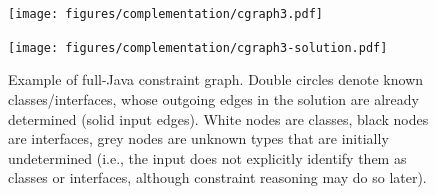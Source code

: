 \begin{figure}[ht]
  \begin{minipage}[b]{.5\linewidth}
    \centering
    \texttt{[image: figures/complementation/cgraph3.pdf]}
    \label{hiercomp/fig:real-example:problem}
  \end{minipage}
  \begin{minipage}[b]{.5\linewidth}
    \centering
    \texttt{[image: figures/complementation/cgraph3-solution.pdf]}
    \label{hiercomp/fig:real-example:solution}
  \end{minipage}
  \caption[Example of full-Java constraint graph]{Example of full-Java
    constraint graph. Double circles denote known classes/interfaces,
    whose outgoing edges in the solution are already determined (solid
    input edges). White nodes are classes, black nodes are interfaces,
    grey nodes are unknown types that are initially undetermined
    (i.e., the input does not explicitly identify them as classes or
    interfaces, although constraint reasoning may do so later).}
  \label{hiercomp/fig:real-example}
\end{figure}





